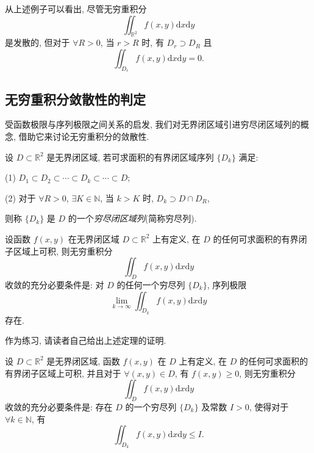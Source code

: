 \begin{remark}\label{remark:ma-15-source-69}
从上述例子可以看出, 尽管无穷重积分
\[
  \iint_{\mathbb R^2} f(x,y)\mathrm dx\mathrm dy
\]
是发散的, 但对于 $\forall R>0$, 当 $r>R$ 时, 有 $D_r\supset D_R$ 且
\[
  \iint_{D_r} f(x,y)\mathrm dx\mathrm dy=0.
\]
\end{remark}


\subsection{无穷重积分敛散性的判定}
\label{subsec:ma-15-5-2}

受函数极限与序列极限之间关系的启发, 我们对无界闭区域引进穷尽闭区域列的概念, 借助它来讨论无穷重积分的敛散性.

\begin{definition}\label{definition:ma-15-5-2}
设 $D\subset\mathbb R^2$ 是无界闭区域, 若可求面积的有界闭区域序列 $\{D_k\}$ 满足:

(1) $D_1\subset D_2\subset\cdots\subset D_k\subset\cdots\subset D$;

(2) 对于 $\forall R>0$, $\exists K\in\mathbb N$, 当 $k>K$ 时, $D_k\supset D\cap D_R$,

则称 $\{D_k\}$ 是 $D$ 的一个\emph{穷尽闭区域列}(简称穷尽列).
\end{definition}


\begin{theorem}\label{theorem:ma-15-5-1}
设函数 $f(x,y)$ 在无界闭区域 $D\subset\mathbb R^2$ 上有定义, 在 $D$ 的任何可求面积的有界闭子区域上可积, 则无穷重积分
\[
  \iint_D f(x,y)\mathrm dx\mathrm dy
\]
收敛的充分必要条件是: 对 $D$ 的任何一个穷尽列 $\{D_k\}$, 序列极限
\[
  \lim_{k\to\infty}\iint_{D_k}f(x,y)\mathrm dx\mathrm dy
\]
存在.
\end{theorem}

作为练习, 请读者自己给出上述定理的证明.

\begin{theorem}\label{theorem:ma-15-5-2}
设 $D\subset\mathbb R^2$ 是无界闭区域, 函数 $f(x,y)$ 在 $D$ 上有定义, 在 $D$ 的任何可求面积的有界闭子区域上可积, 并且对于 $\forall(x,y)\in D$, 有 $f(x,y)\geqslant0$, 则无穷重积分
\[
  \iint_D f(x,y)\mathrm dx\mathrm dy
\]
收敛的充分必要条件是: 存在 $D$ 的一个穷尽列 $\{D_k\}$ 及常数 $I>0$, 使得对于 $\forall k\in\mathbb N$, 有
\[
  \iint_{D_k}f(x,y)\mathrm dx\mathrm dy\leqslant I.
\]
\end{theorem}


